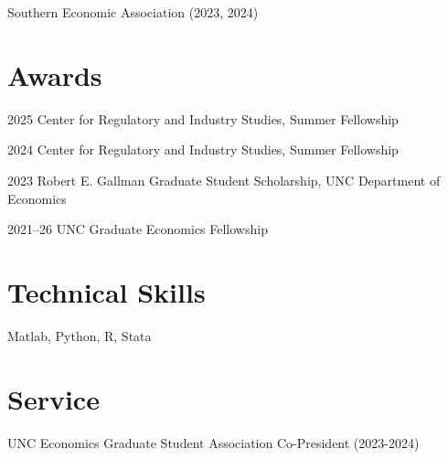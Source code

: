 \documentclass[12pt,letterpaper]{report}
\newcommand{\listitemspace}{0.25em}
\renewenvironment{itemize}
{\begin{list}{}{\setlength{\leftmargin}{0em}
			\setlength{\parskip}{0em}
			\setlength{\itemsep}{\listitemspace}
			\setlength{\parsep}{\listitemspace}}}
	{\end{list}}
\begin{document}
	\begin{itemize}
        \item Southern Economic Association (2023, 2024)
	\end{itemize}
	

	\section*{Awards}
	
	\begin{tablist}
        \item[2025] \tab{}Center for Regulatory and Industry Studies, Summer Fellowship
		\item[2024] \tab{}Center for Regulatory and Industry Studies, Summer Fellowship
		\item[2023] \tab{}Robert E. Gallman Graduate Student Scholarship, UNC Department of Economics
		\item[2021--26] \tab{}UNC Graduate Economics Fellowship
	\end{tablist}
	
	
	\section*{Technical Skills}
	
	Matlab, Python, R, Stata
	
	\section*{Service}
	
	UNC Economics Graduate Student Association Co-President (2023-2024)
	
	
\end{document}

